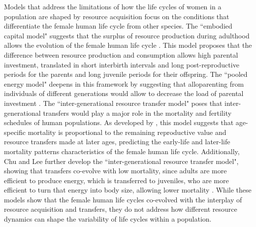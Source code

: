 \documentclass{article}
\begin{document}
Models that address the limitations of how the life cycles of women in a population are shaped by resource acquisition focus on the conditions that differentiate the female human life cycle from other species. The ``embodied capital model" suggests that the surplus of resource production during adulthood allows the evolution of the female human life cycle \citep{kaplan2000theory}. This model proposes that the difference between resource production and consumption allows high parental investment, translated in short interbirth intervals and long post-reproductive periods for the parents and long juvenile periods for their offspring. The ``pooled energy model" deepens in this framework by suggesting that alloparenting from individuals of different generations would allow to decrease the load of parental investment \citep{kramer2010pooled}. The ``inter-generational resource transfer model" poses that inter-generational transfers would play a major role in the mortality and fertility schedules of human populations. As developed by \cite{lee2003rethinking}, this model suggests that age-specific mortality is proportional to the remaining reproductive value and resource transfers made at later ages, predicting the early-life and later-life mortality patterns characteristics of the female human life cycle. Additionally, Chu and Lee further develop the ``inter-generational resource transfer model", showing that transfers co-evolve with low mortality, since adults are more efficient to produce energy, which is transferred to juveniles, who are more efficient to turn that energy into body size, allowing lower mortality \citep{chu2006co}. While these models show that the female human life cycles co-evolved with the interplay of resource acquisition and transfers, they do not address how different resource dynamics can shape the variability of life cycles within a population.
\end{document}
